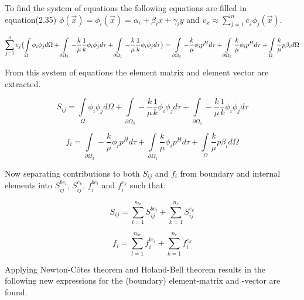 \documentclass[a4paper]{report}
\begin{document}
\vspace{1mm}

To find the system of equations the following equations are filled in equation(2.35)  
$\phi(\vec{x})=\phi_i(\vec{x})= \alpha_i+\beta_i x+\gamma_i y$ and  $v_x\approx \sum\limits_{j=1}^{n}c_j\phi_j(\vec{x})$.

\begin{equation}\label{SoQ2}
	\sum_{j=1}^{n}c_j\{\int\limits_{\Omega}\phi_i\phi_j d\Omega +\int\limits_{\partial\Omega_3}-\frac{k}{\mu}\frac{1}{k}\phi_i\phi_j d\tau + \int\limits_{\partial\Omega_1}-\frac{k}{\mu}\frac{1}{k}\phi_i\phi_j d\tau\} = \\
	\int\limits_{\partial\Omega_3}-\frac{k}{\mu}\phi_i p^H d\tau +\int\limits_{\partial\Omega_1}\frac{k}{\mu}\phi_i p^H d\tau + \int\limits_{\Omega}\frac{k}{\mu}p\beta_id\Omega 
\end{equation}

From this system of equations the element matrix and element vector are extracted.

\begin{equation}
S_{ij}=\int\limits_{\Omega}\phi_i\phi_j d\Omega +\int\limits_{\partial\Omega_3}-\frac{k}{\mu}\frac{1}{k}\phi_i\phi_j d\tau + \int\limits_{\partial\Omega_1}-\frac{k}{\mu}\frac{1}{k}\phi_i\phi_j d\tau 
\end{equation}

\begin{equation}
f_i = 
\int\limits_{\partial\Omega_3}-\frac{k}{\mu}\phi_i p^H d\tau +\int\limits_{\partial\Omega_1}\frac{k}{\mu}\phi_i p^H d\tau + \int\limits_{\Omega}\frac{k}{\mu}p\beta_id\Omega
\end{equation}

Now separating contributions to both $S_{ij}$ and $f_i$ from boundary and internal elements into $S_{ij}^{be_l}$, $S_{ij}^{e_k}$, $f_i^{be_l}$ and $f_i^{e_k}$ such that:

\begin{equation}
	S_{ij} = \sum\limits_{l=1}^{n_{be}} S_{ij}^{be_{l}} + \sum\limits_{k=1}^{n_{e}} S_{ij}^{e_{k}}
\end{equation}

\begin{equation}
f_{i} = \sum\limits_{l=1}^{n_{be}} f_{i}^{be_{l}} + \sum\limits_{k=1}^{n_{e}} f_{i}^{e_{k}}
\end{equation}

Applying Newton-Côtes theorem and Holand-Bell theorem results in the following new expressions for the (boundary) element-matrix and -vector are found.
\end{document}
